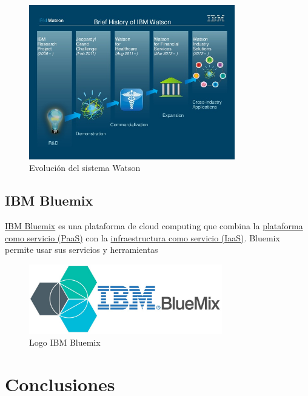 \documentclass[paper=a4, fontsize=10pt]{scrartcl} %
\numberwithin{equation}{section} %
\numberwithin{figure}{section} %
\numberwithin{table}{section} %
\begin{document}
\begin{figure}[H]
	\centering
	\label{watson2today}
	\includegraphics[trim = 0mm 14mm 0mm 10mm, clip, width=0.8\textwidth]{./Imagenes/watson2today.jpg}
	\caption{Evolución del sistema Watson \cite{watson-history}}
\end{figure}



\subsection{IBM Bluemix}


\begin{minipage}{\linewidth}
	\centering
	\begin{minipage}{0.45\linewidth}
\href{https://www.ibm.com/cloud-computing/bluemix/es/node/2041}{IBM Bluemix} \cite{bluemix-doc} es una plataforma de cloud computing que combina la \href{https://azure.microsoft.com/es-es/overview/what-is-paas/}{plataforma como servicio (PaaS)} con la \href{https://azure.microsoft.com/es-es/overview/what-is-iaas/}{infraestructura como servicio (IaaS)}.
Bluemix permite usar sus servicios y herramientas
	\end{minipage}
	\hspace{0.1cm}
	\begin{minipage}{0.45\linewidth}
		\begin{figure}[H]
			\centering
			\label{ibm-bluemix.jpg}
			\includegraphics[width=0.75\textwidth]{./Imagenes/ibm-bluemix.jpg}
			\caption{Logo IBM Bluemix \cite{bluemix-image}}
		\end{figure}
	\end{minipage}
\end{minipage}


\section{Conclusiones}



\newpage
\end{document}
